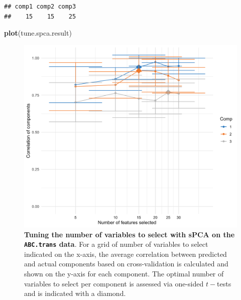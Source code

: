 \documentclass[]{book}
\newenvironment{Shaded}{\begin{snugshade}}{\end{snugshade}}
\newcommand{\CommentTok}[1]{\textcolor[rgb]{0.56,0.35,0.01}{\textit{#1}}}
\newcommand{\DataTypeTok}[1]{\textcolor[rgb]{0.13,0.29,0.53}{#1}}
\newcommand{\DecValTok}[1]{\textcolor[rgb]{0.00,0.00,0.81}{#1}}
\newcommand{\KeywordTok}[1]{\textcolor[rgb]{0.13,0.29,0.53}{\textbf{#1}}}
\newcommand{\NormalTok}[1]{#1}
\newcommand{\OperatorTok}[1]{\textcolor[rgb]{0.81,0.36,0.00}{\textbf{#1}}}
\newcommand{\StringTok}[1]{\textcolor[rgb]{0.31,0.60,0.02}{#1}}
\begin{document}
\begin{Shaded}
\end{Shaded}

\begin{verbatim}
## comp1 comp2 comp3 
##    15    15    25
\end{verbatim}

\begin{Shaded}
\begin{Highlighting}[]
\KeywordTok{plot}\NormalTok{(tune.spca.result)}
\end{Highlighting}
\end{Shaded}

\begin{figure}

{\centering \includegraphics[width=0.5\linewidth]{Figures/PCA/spca-tuning-ABStrans-1} 

}

\caption{\textbf{Tuning the number of variables to select with sPCA on the \texttt{ABC.trans} data}. For a grid of number of variables to select indicated on the x-axis, the average correlation between predicted and actual components based on cross-validation is calculated and shown on the y-axis for each component. The optimal number of variables to select per component is assessed via one-sided \(t-\)tests and is indicated with a diamond.}\label{fig:spca-tuning-ABStrans}
\end{figure}
\end{document}
